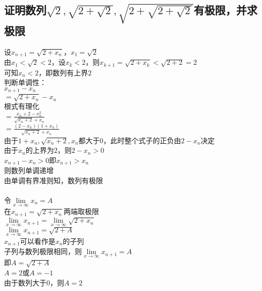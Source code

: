 \documentclass{article}
\begin{document}
\begin{flushleft}
\subsection{
证明数列$\sqrt{2}, \sqrt{2+\sqrt{2}}, \sqrt{2+\sqrt{2+\sqrt{2}}}$有极限，并求极限
}
设$x_{n+1}=\sqrt{2+x_n}$，$x_1=\sqrt{2}$\\
由$x_1<\sqrt{2}<2$，设$x_k<2$，则$x_{k+1}=\sqrt{2+x_k}<\sqrt{2+2}=2$\\
可知$x_n<2$，即数列有上界$2$\\
判断单调性：\\
$x_{n+1}-x_n$\\
$=\sqrt{2+x_n}-x_n$\\
根式有理化\\
$=\frac{x_n+2-x_n^2}{\sqrt{x_n+2}+x_n}$\\
$=\frac{(2-x_n)(1+x_n)}{\sqrt{x_n+2}+x_n}$\\
由于$1+x_n, \sqrt{x_n+2}, x_n$都大于0，此时整个式子的正负由$2-x_n$决定\\
由于$x_n$的上界为$2$，则$2-x_n>0$\\
$x_{n+1}-x_n>0$即$x_{n+1}>x_n$\\
则数列单调递增\\
由单调有界准则知，数列有极限\\
~\\
令$\lim\limits_{x\to\infty}x_n=A$\\
在$x_{n+1}=\sqrt{2+x_n}$两端取极限\\
$\lim\limits_{x\to\infty}x_{n+1}=\lim\limits_{x\to\infty}\sqrt{2+x_n}$\\
$\lim\limits_{x\to\infty}x_{n+1}=\sqrt{2+A}$\\
$x_{n+1}$可以看作是$x_n$的子列\\
子列与数列极限相同，则$\lim\limits_{x\to\infty}x_{n+1}=A$\\
即$A=\sqrt{2+A}$\\
$A=2$或$A=-1$\\
由于数列大于0，则$A=2$\\




\end{flushleft}
\end{document}
